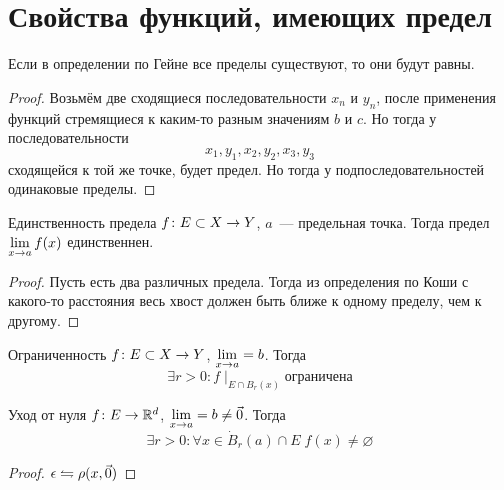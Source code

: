 \section{Свойства функций, имеющих предел}
\begin{Rem}
Если в определении по Гейне все пределы существуют, то они будут равны.
\end{Rem}
\begin{proof}
Возьмём две сходящиеся последовательности $x_n$ и $y_n$, после применения функций стремящиеся к каким-то разным значениям $b$ и $c$. Но тогда
у последовательности 
$$x_1, y_1, x_2, y_2, x_3, y_3$$
сходящейся к той же точке, будет предел. Но тогда у подпоследовательностей одинаковые пределы.
\end{proof}

\begin{assertion}{Единственность предела}
$f\colon E \subset X \rightarrow Y$, $a$~--- предельная точка. Тогда предел $\lim\limits_{x\rightarrow a} f(x)$ единственнен.
\end{assertion}
\begin{proof}
Пусть есть два различных предела. Тогда из определения по Коши с какого-то расстояния весь хвост должен быть ближе к одному пределу, чем к другому.
\end{proof}

\begin{theorem}{Ограниченность}
$f\colon E \subset X \rightarrow Y$, $\lim\limits_{x\rightarrow a} = b$. Тогда 
$$\exists r>0\colon f \mid_{E \cap B_r(x)}\text{ограничена}$$
\end{theorem}

\begin{theorem}{Уход от нуля}
$f\colon E \rightarrow \mathbb{R}^d$, $\lim\limits_{x\rightarrow a} = b \ne \vec 0$. Тогда
$$\exists r>0\colon \forall x \in \dot B_r(a) \cap E\; f(x) \ne \varnothing$$
\end{theorem}
\begin{proof}
$\epsilon \leftrightharpoons \rho(x, \vec 0)$
\end{proof}